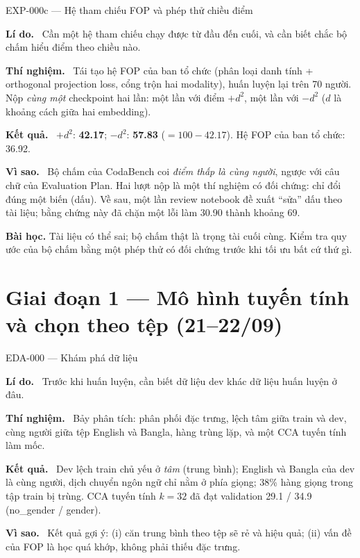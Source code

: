\documentclass[11pt,a4paper,oneside]{report}
\newcommand{\field}[1]{\par\smallskip\textbf{\color{accent}#1.}~}
\begin{document}
\begin{expbox}{EXP-000c --- Hệ tham chiếu FOP và phép thử chiều điểm}
\field{Lí do} Cần một hệ tham chiếu chạy được từ đầu đến cuối, và cần biết chắc bộ chấm hiểu điểm theo chiều nào.
\field{Thí nghiệm} Tái tạo hệ FOP của ban tổ chức (phân loại danh tính + orthogonal projection loss, cổng trộn hai modality), huấn luyện lại trên 70 người. Nộp \emph{cùng một} checkpoint hai lần: một lần với điểm $+d^2$, một lần với $-d^2$ ($d$ là khoảng cách giữa hai embedding).
\field{Kết quả} $+d^2$: \textbf{42.17}; $-d^2$: \textbf{57.83} ($=100-42.17$). Hệ FOP của ban tổ chức: 36.92.
\field{Vì sao} Bộ chấm của CodaBench coi \emph{điểm thấp là cùng người}, ngược với câu chữ của Evaluation Plan. Hai lượt nộp là một thí nghiệm có đối chứng: chỉ đổi đúng một biến (dấu). Về sau, một lần review notebook đề xuất ``sửa'' dấu theo tài liệu; bằng chứng này đã chặn một lỗi làm 30.90 thành khoảng 69.
\end{expbox}

\begin{lesson}
\textbf{Bài học.} Tài liệu có thể sai; bộ chấm thật là trọng tài cuối cùng. Kiểm tra quy ước của bộ chấm bằng một phép thử có đối chứng trước khi tối ưu bất cứ thứ gì.
\end{lesson}

\section{Giai đoạn 1 --- Mô hình tuyến tính và chọn theo tệp (21--22/09)}
\label{sec:p1}

\begin{expbox}{EDA-000 --- Khám phá dữ liệu}
\field{Lí do} Trước khi huấn luyện, cần biết dữ liệu dev khác dữ liệu huấn luyện ở đâu.
\field{Thí nghiệm} Bảy phân tích: phân phối đặc trưng, lệch tâm giữa train và dev, cùng người giữa tệp English và Bangla, hàng trùng lặp, và một CCA tuyến tính làm mốc.
\field{Kết quả} Dev lệch train chủ yếu ở \emph{tâm} (trung bình); English và Bangla của dev là cùng người, dịch chuyển ngôn ngữ chỉ nằm ở phía giọng; 38\% hàng giọng trong tập train bị trùng. CCA tuyến tính $k=32$ đã đạt validation 29.1 / 34.9 (no\_gender / gender).
\field{Vì sao} Kết quả gợi ý: (i) căn trung bình theo tệp sẽ rẻ và hiệu quả; (ii) vấn đề của FOP là học quá khớp, không phải thiếu đặc trưng.
\end{expbox}
\end{document}
